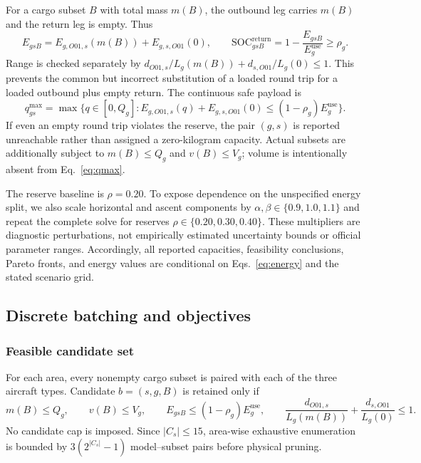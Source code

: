 \documentclass[11pt,a4paper]{article}
\newcommand{\SOC}{\mathrm{SOC}}
\begin{document}
For a cargo subset $B$ with total mass $m(B)$, the outbound leg carries $m(B)$ and the return leg is empty. Thus
\begin{equation}
E_{gsB}=E_{g,O01,s}(m(B))+E_{g,s,O01}(0),\qquad
\SOC^{\mathrm{return}}_{gsB}=1-\frac{E_{gsB}}{E_g^{\mathrm{use}}}\ge \rho_g.
\label{eq:roundtrip}
\end{equation}
Range is checked separately by $d_{O01,s}/L_g(m(B))+d_{s,O01}/L_g(0)\le1$. This prevents the common but incorrect substitution of a loaded round trip for a loaded outbound plus empty return. The continuous safe payload is
\begin{equation}
q^{\max}_{gs}=\max\{q\in[0,Q_g]: E_{g,O01,s}(q)+E_{g,s,O01}(0)\le(1-\rho_g)E_g^{\mathrm{use}}\}.
\label{eq:qmax}
\end{equation}
If even an empty round trip violates the reserve, the pair $(g,s)$ is reported unreachable rather than assigned a zero-kilogram capacity. Actual subsets are additionally subject to $m(B)\le Q_g$ and $v(B)\le V_g$; volume is intentionally absent from Eq.~\eqref{eq:qmax}.

The reserve baseline is $\rho=0.20$. To expose dependence on the unspecified energy split, we also scale horizontal and ascent components by $\alpha,\beta\in\{0.9,1.0,1.1\}$ and repeat the complete solve for reserves $\rho\in\{0.20,0.30,0.40\}$. These multipliers are diagnostic perturbations, not empirically estimated uncertainty bounds or official parameter ranges. Accordingly, all reported capacities, feasibility conclusions, Pareto fronts, and energy values are conditional on Eqs.~\eqref{eq:energy} and the stated scenario grid.

\subsection{Discrete batching and objectives}
\subsubsection{Feasible candidate set}
For each area, every nonempty cargo subset is paired with each of the three aircraft types. Candidate $b=(s,g,B)$ is retained only if
\begin{equation}
m(B)\le Q_g,\qquad v(B)\le V_g,\qquad
E_{gsB}\le(1-\rho_g)E_g^{\mathrm{use}},\qquad
\frac{d_{O01,s}}{L_g(m(B))}+\frac{d_{s,O01}}{L_g(0)}\le1.
\label{eq:candidate}
\end{equation}
No candidate cap is imposed. Since $|C_s|\le15$, area-wise exhaustive enumeration is bounded by $3(2^{|C_s|}-1)$ model--subset pairs before physical pruning.
\end{document}
